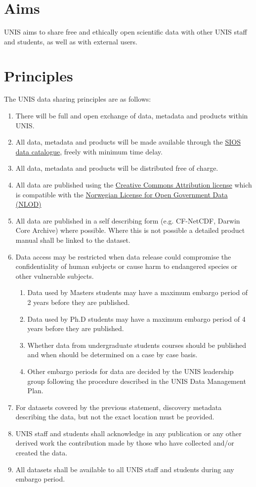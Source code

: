 \documentclass[a4paper,english, 11pt]{article}
\begin{document}
\section{Aims}
\label{s:aims}

UNIS aims to share free and ethically open scientific data with other UNIS staff and students, as well as with external users. 

\section{Principles}
\label{s:principles}

The UNIS data sharing principles are as follows:

\begin{enumerate}[I]
\item There will be full and open exchange of data, metadata and products within UNIS.
\item All data, metadata and products will be made available through the \href{https://sios-svalbard.org/metsis/search}{SIOS data catalogue}, freely with minimum time delay.
\item All data, metadata and products will be distributed free of charge.
\item All data are published using the \href{https://creativecommons.org/licenses/by/4.0/}{Creative Commons Attribution license} which is
compatible with the \href{https://data.norge.no/nlod/en}{Norwegian License for Open Government Data (NLOD)}
\item All data are published in a self describing form (e.g. CF-NetCDF, Darwin Core Archive) where possible. Where this is not possible a detailed product manual shall be linked to the dataset.
\item Data access may be restricted when data release could compromise the confidentiality
of human subjects or cause harm to endangered species or other vulnerable subjects.
\begin{enumerate}[A]
\item Data used by Masters students may have a maximum embargo period of 2 years before
they are published.
\item Data used by Ph.D students may have a maximum embargo period of 4 years before
they are published.
\item Whether data from undergraduate students courses should be published and when should be determined on a case by case basis.
\item Other embargo periods for data are decided by the UNIS leadership group
following the procedure described in the UNIS Data Management Plan.
\end{enumerate}
\item For datasets covered by the previous statement, discovery metadata describing the data, but not the exact location must be provided.
\item UNIS staff and students shall acknowledge in any publication or any other derived work the contribution made by those who have collected and/or created the data.
\item All datasets shall be available to all UNIS staff and students during any embargo period.
\end{enumerate}
\end{document}
